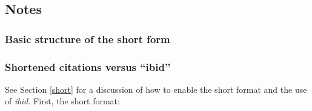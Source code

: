 \documentclass[11pt,letterpaper,oneside]{article}
\begin{document}
\setcounter{subsection}{1}
\subsection{Notes}
\setcounter{subsection}{14}

\setcounter{subsubsection}{29}
\subsubsection{Basic structure of the short form}
\label{14.30}

\begin{citebib}
\item \cite[24--25]{morley1995}
\item \cite{schwartz1992}
\item \cite{kaiser1964}
\item \cite[43]{morley1995}
\item \cite[138]{schwartz1992}
\item \cite[189--90]{kaiser1964}
\end{citebib}

\setcounter{subsubsection}{33}
\subsubsection{Shortened citations versus ``ibid''}
\label{14.34}

See Section \ref{short} for a discussion of how to enable the short
format and the use of \textit{ibid.} First, the short format:

\begin{citeonly}
\item \cite[3]{morrison2004a}
\item \cite[18]{morrison2004a}
\item \cite[18]{morrison2004a}
\item \cite[24--26]{morrison2004a}
\item \cite[401-2]{morrison2004b}
\item \cite[433]{morrison2004b}
\item \cite[37--38]{diaz2008}
\item \cite[403]{morrison2004b}
\item \cite[152]{diaz2008}
\item \cite[201-2]{diaz2008}
\item \cites[240]{morrison2004b}[32]{morrison2004a}
 \item \cite[33]{morrison2004a}
\end{citeonly}
\end{document}
